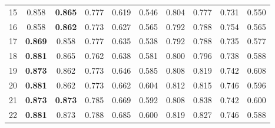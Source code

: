 \begin{table}[]
\begin{tabular}{|c|ccccccccc|}
15   & 0.858                            & \textbf{0.865}               & 0.777                              & 0.619                             & 0.546                    & 0.804                             & 0.777                             & 0.731                            & 0.550                       \\ \cline{1-1}
16   & 0.858                            & \textbf{0.862}               & 0.773                              & 0.627                             & 0.565                    & 0.792                             & 0.788                             & 0.754                            & 0.565                       \\ \cline{1-1}
17   & \textbf{0.869}                   & 0.858                        & 0.777                              & 0.635                             & 0.538                    & 0.792                             & 0.788                             & 0.735                            & 0.577                       \\ \cline{1-1}
18   & \textbf{0.881}                   & 0.865                        & 0.762                              & 0.638                             & 0.581                    & 0.800                             & 0.796                             & 0.738                            & 0.588                       \\ \hline
19   & \textbf{0.873}                   & 0.862                        & 0.773                              & 0.646                             & 0.585                    & 0.808                             & 0.819                             & 0.742                            & 0.608                       \\ \cline{1-1}
20   & \textbf{0.881}                   & 0.862                        & 0.773                              & 0.662                             & 0.604                    & 0.812                             & 0.815                             & 0.746                            & 0.596                       \\ \cline{1-1}
21   & \textbf{0.873}                   & \textbf{0.873}               & 0.785                              & 0.669                             & 0.592                    & 0.808                             & 0.838                             & 0.742                            & 0.600                       \\ \cline{1-1}
22   & \textbf{0.881}                   & 0.873                        & 0.788                              & 0.685                             & 0.600                    & 0.819                             & 0.827                             & 0.746                            & 0.588                       \\ \cline{1-1}

\end{tabular}
\end{table}
